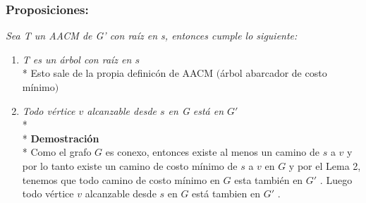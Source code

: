 \documentclass{article}
\begin{document}
    
    \subsubsection{Proposiciones:}
    
    \noindent \textit{Sea T un AACM de G' con ra\'iz en s, entonces cumple lo siguiente:}

    \begin{enumerate}
        \item  \textit{T es un \'arbol con ra\'iz en $s$}
        \\*
        Esto sale de la propia definic\'on de AACM $($\'arbol abarcador de costo m\'inimo$)$
        
        \vspace*{0.3cm}

        \item \textit{Todo v\'ertice $v$ alcanzable desde $s$ en G est\'a en $G'$}
        \\*
        \\*
        \textbf{Demostraci\'on } 
        \\*
        Como el grafo $G$ es conexo, entonces existe al menos un camino de $s$ a $v$ y por lo tanto existe un camino de costo m\'inimo 
        de $s$ a $v$ en $G$ y por el Lema 2, tenemos que todo camino de costo m\'inimo en $G$ esta tambi\'en en $G'$ . Luego todo v\'ertice 
        $v$ alcanzable desde $s$ en $G$ est\'a tambien en $G'$ . 
        
        \vspace*{0.3cm} 


\end{enumerate}
\end{document}
